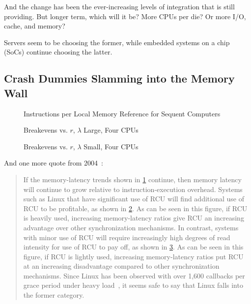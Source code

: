 And the change has been the ever-increasing levels of integration
that  is still providing.
But longer term, which will it be?
More CPUs per die?
Or more I/O, cache, and memory?

Servers seem to be choosing the former, while embedded systems on a chip
(SoCs) continue choosing the latter.

\subsection{Crash Dummies Slamming into the Memory Wall}
\label{sec:future:Crash Dummies Slamming into the Memory Wall}

\begin{figure}[tbp]
\centering
\epsfxsize=3in
\caption{Instructions per Local Memory Reference for Sequent Computers}
\label{fig:future:Instructions per Local Memory Reference for Sequent Computers}
\end{figure}

\begin{figure}[htbp]
\centering
\epsfxsize=3in
\caption{Breakevens vs. $r$, $\lambda$ Large, Four CPUs}
\label{fig:future:Breakevens vs. r; lambda Large; Four CPUs}
\end{figure}

\begin{figure}[htbp]
\centering
\epsfxsize=3in
\caption{Breakevens vs. $r$, $\lambda$ Small, Four CPUs}
\label{fig:future:Breakevens vs. r; Worst-Case lambda; Four CPUs}
\end{figure}

And one more quote from 2004~\cite{PaulEdwardMcKenneyPhD}:

\begin{quote}
	If the memory-latency trends shown in
	\cref{fig:future:Instructions per Local Memory Reference for Sequent Computers}
	continue, then memory latency will continue to grow relative
	to instruction-execution overhead.
	Systems such as Linux that have significant use of RCU will find
	additional use of RCU to be profitable, as shown in
	\cref{fig:future:Breakevens vs. r; lambda Large; Four CPUs}.
	As can be seen in this figure, if RCU is heavily used, increasing
	memory-latency ratios give RCU an increasing advantage over other
	synchronization mechanisms.
	In contrast, systems with minor
	use of RCU will require increasingly high degrees of read intensity
	for use of RCU to pay off, as shown in
	\cref{fig:future:Breakevens vs. r; Worst-Case lambda; Four CPUs}.
	As can be seen in this figure, if RCU is lightly used,
	increasing memory-latency ratios
	put RCU at an increasing disadvantage compared to other synchronization
	mechanisms.
	Since Linux has been observed with over 1,600 callbacks per grace
	period under heavy load~\cite{Sarma04c},
	it seems safe to say that Linux falls into the former category.
\end{quote}

